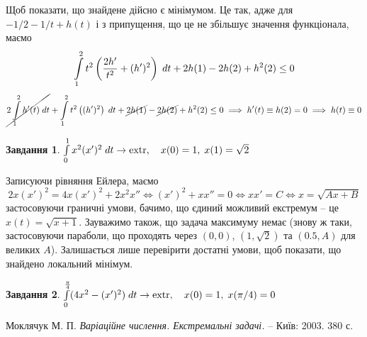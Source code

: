 \documentclass[12pt]{article} %
\newtheorem{prob}{Завдання}
\newcommand{\dt}{\;dt}
\let\oldint\int
\renewcommand{\int}{\oldint\limits}
\newcommand{\extr}{\mbox{\normalfont extr}}
\begin{document}
Щоб показати, що знайдене дійсно є мінімумом. Це так, адже для $-1/2-1/t+h(t)$ і з припущення, що це не збільшує значення функціонала, маємо
\[\int_1^2t^2\mybra{\frac{2h'}{t^2}+(h')^2}\dt+2h(1)-2h(2)+h^2(2)\leq0\]
\[\cancel{2\int_1^2h'(t)\dt}+\int_1^2t^2\mybra{(h')^2}\dt+\cancel{2h(1)}-\cancel{2h(2)}+h^2(2)\leq0\implies h'(t)\equiv h(2)=0\implies h(t)\equiv0\]
\begin{prob}{}\; $\int_0^1x^2(x')^2\dt\to\extr,\quad x(0)=1,\;x(1)=\sqrt{2}$\end{prob}
	Записуючи рівняння Ейлера, маємо
	\[2x(x')^2=4x(x')^2+2x^2x''\iff (x')^2+xx''=0\iff xx'=C\iff x=\sqrt{Ax+B}\]
	застосовуючи граничні умови, бачимо, що єдиний можливий екстремум -- це $x(t)=\sqrt{x+1}$. Зауважимо також, що задача
	максимуму немає (знову ж таки, застосовуючи параболи, що проходять через $(0,0)$, $(1,\sqrt{2})$ та $(0.5,A)$ для великих $A$). Залишається
	лише перевірити достатні умови, щоб показати, що знайдено локальний мінімум.
	\begin{enumerate}
	\end{enumerate}
\begin{prob}{}\; $\int_0^{\frac{\pi}{4}}(4x^2-(x')^2)\dt\to\extr,\quad x(0)=1,\;x(\pi/4)=0$
\end{prob}
\begin{thebibliography}{9}
Моклячук М. П. \emph{Варіаційне числення. Екстремальні задачі.} --
Київ: 2003. 380 с.
\end{thebibliography}
\end{document}
